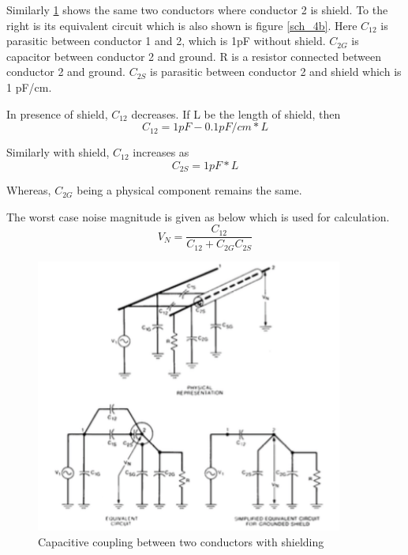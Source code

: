\documentclass[12pt,a4paper,UKenglish]{article}
\begin{document}
Similarly  \ref{two_con_sh} shows the same two conductors where conductor 2 is shield. To the right is its equivalent circuit which is also shown is figure  \ref{sch_4b}. Here $C_{12}$ is parasitic between conductor 1 and 2, which is 1pF without shield. $C_{2G}$ is capacitor between conductor 2 and ground. R is a resistor connected between conductor 2 and ground. $C_{2S}$ is parasitic between conductor 2 and shield which is 1 pF/cm. 

In presence of shield, $C_{12}$ decreases. If L be the length of shield, then
\begin{equation*}
C_{12} =  1 pF - 0.1pF/cm * L
\end{equation*}

Similarly with shield, $C_{12}$ increases as 
\begin{equation*}
C_{2S} =  1 pF * L
\end{equation*}

Whereas, $C_{2G}$ being a physical component remains the same.

The worst case noise magnitude is given as below which is used for calculation.
\begin{equation*}
V_N = \frac{C_{12}}{C_{12}+C_{2G}C_{2S}}   
\end{equation*}


\begin{figure} [H]
  \centering 
  \includegraphics[width=0.9\textwidth]{img/two_con_sh.png} 
  \caption{Capacitive coupling between two conductors with shielding}
  \label{two_con_sh} 
\end{figure}
\end{document}
